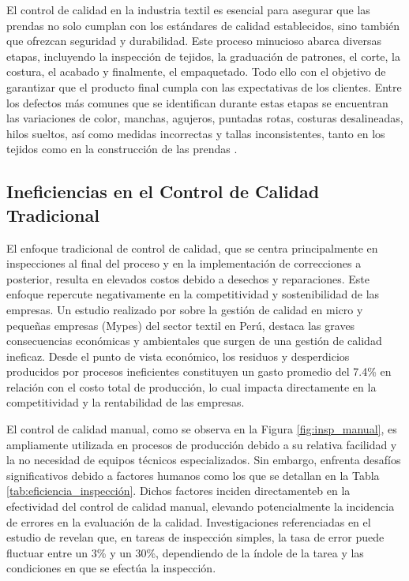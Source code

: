 El control de calidad en la industria textil es esencial para asegurar que las prendas no solo cumplan con los estándares de calidad establecidos, sino también que ofrezcan seguridad y durabilidad. Este proceso minucioso abarca diversas etapas, incluyendo la inspección de tejidos, la graduación de patrones, el corte, la costura, el acabado y finalmente, el empaquetado. Todo ello con el objetivo de garantizar que el producto final cumpla con las expectativas de los clientes. Entre los defectos más comunes que se identifican durante estas etapas se encuentran las variaciones de color, manchas, agujeros, puntadas rotas, costuras desalineadas, hilos sueltos, así como medidas incorrectas y tallas inconsistentes, tanto en los tejidos como en la construcción de las prendas \cite{TetraInspection2024}. 

\subsection*{Ineficiencias en el Control de Calidad Tradicional}

El enfoque tradicional de control de calidad, que se centra principalmente en inspecciones al final del proceso y en la implementación de correcciones a posterior, resulta en elevados costos debido a desechos y reparaciones. Este enfoque repercute negativamente en la competitividad y sostenibilidad de las empresas. Un estudio realizado por \cite{BonillaPastor2015} sobre la gestión de calidad en micro y pequeñas empresas (Mypes) del sector textil en Perú, destaca las graves consecuencias económicas y ambientales que surgen de una gestión de calidad ineficaz. Desde el punto de vista económico, los residuos y desperdicios producidos por procesos ineficientes constituyen un gasto promedio del 7.4\% en relación con el costo total de producción, lo cual impacta directamente en la competitividad y la rentabilidad de las empresas.

El control de calidad manual, como se observa en la Figura \ref{fig:insp_manual}, es ampliamente utilizada en procesos de producción debido a su relativa facilidad y la no necesidad de equipos técnicos especializados. Sin embargo, enfrenta desafíos significativos debido a factores humanos como los que se detallan en la Tabla \ref{tab:eficiencia_inspección}. Dichos factores inciden directamenteb en la efectividad del control de calidad manual, elevando potencialmente la incidencia de errores en la evaluación de la calidad. Investigaciones referenciadas en el estudio de \cite{KujawinskaVogt2015} revelan que, en tareas de inspección simples, la tasa de error puede fluctuar entre un 3\% y un 30\%, dependiendo de la índole de la tarea y las condiciones en que se efectúa la inspección.

